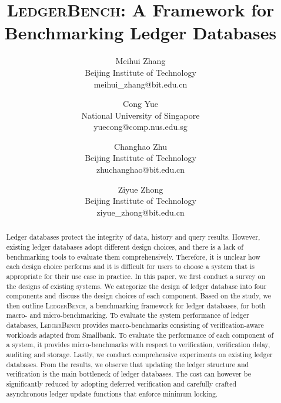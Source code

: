\documentclass[11pt,dvipdfm]{article}
\newcommand{\systemname}{\textsc{LedgerBench}\xspace}
\begin{document}
\title{\systemname: A Framework for Benchmarking Ledger Databases}

\author{
Meihui Zhang \\
Beijing Institute of Technology \\
meihui\_zhang@bit.edu.cn \\
\and
Cong Yue \\
National University of Singapore \\
yuecong@comp.nus.edu.sg \\
\and
Changhao Zhu \\
Beijing Institute of Technology \\
zhuchanghao@bit.edu.cn \\
\and
Ziyue Zhong \\
Beijing Institute of Technology \\
ziyue\_zhong@bit.edu.cn \\
}

\maketitle

\begin{abstract}
Ledger databases protect the integrity of data, history and query results. However, existing ledger databases adopt different design choices, and there is a lack of benchmarking tools to evaluate them comprehensively. Therefore, it is unclear how each design choice performs and it is difficult for users to choose a system that is appropriate for their use case in practice. 
In this paper, we first conduct a survey on the designs of existing systems. 
We categorize the design of ledger database into four components and discuss the design choices of each component. 
Based on the study,
we then outline \systemname, a benchmarking framework for ledger databases, for 
both macro- and micro-benchmarking.
To evaluate the system performance of ledger databases, \systemname provides macro-benchmarks consisting of verification-aware workloads adapted from Smallbank.
To evaluate the performance of each component of a system, it provides micro-benchmarks with respect to verification, verification delay, auditing and storage.
Lastly, we conduct comprehensive experiments on existing ledger databases. 
From the results, we observe that updating the ledger structure and verification is the main bottleneck of ledger databases. The cost can however be significantly reduced by adopting deferred verification and carefully crafted asynchronous ledger update functions that enforce minimum locking. 
\end{abstract}
\end{document}
